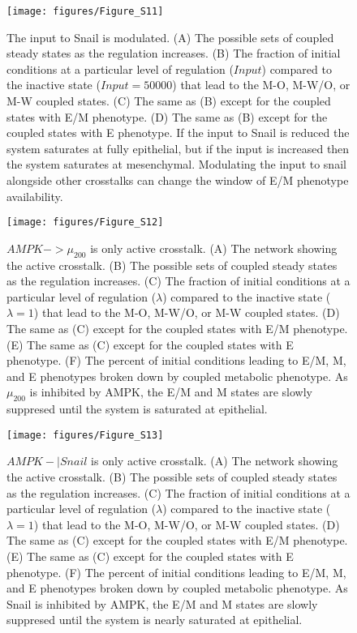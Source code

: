 \documentclass{article}
\begin{document}
\begin{figure}
\texttt{[image: figures/Figure\_S11]}
\caption{The input to Snail is modulated. (A) The possible sets of coupled steady states as the regulation increases. (B) The fraction of initial conditions at a particular level of regulation ($Input$) compared to the inactive state ($Input=50000$) that lead to the M-O, M-W/O, or M-W coupled states. (C) The same as  (B) except for the coupled states with E/M phenotype. (D) The same as (B) except for the coupled states with E phenotype. If the input to Snail is reduced the system saturates at fully epithelial, but if the input is increased then the system saturates at mesenchymal. Modulating the input to snail alongside other crosstalks can change the window of E/M phenotype availability.}
\end{figure}

\begin{figure}
\texttt{[image: figures/Figure\_S12]}
\caption{$AMPK -> \mu_{200}$ is only active crosstalk. (A) The network showing the active crosstalk. (B) The possible sets of coupled steady states as the regulation increases. (C) The fraction of initial conditions at a particular level of regulation ($\lambda$) compared to the inactive state ($\lambda=1$) that lead to the M-O, M-W/O, or M-W coupled states. (D) The same as (C) except for the coupled states with E/M phenotype. (E) The same as (C) except for the coupled states with E phenotype. (F) The percent of initial conditions leading to E/M, M, and E phenotypes broken down by coupled metabolic phenotype. As $\mu_{200}$  is inhibited by AMPK, the E/M and M states are slowly suppresed until the system is saturated at epithelial. }
\end{figure}




\begin{figure}
\texttt{[image: figures/Figure\_S13]}
\caption{$AMPK -| Snail$ is only active crosstalk. (A) The network showing the active crosstalk. (B) The possible sets of coupled steady states as the regulation increases. (C) The fraction of initial conditions at a particular level of regulation ($\lambda$) compared to the inactive state ($\lambda=1$) that lead to the M-O, M-W/O, or M-W coupled states. (D) The same as (C) except for the coupled states with E/M phenotype. (E) The same as (C) except for the coupled states with E phenotype. (F) The percent of initial conditions leading to E/M, M, and E phenotypes broken down by coupled metabolic phenotype. As Snail is inhibited by AMPK, the E/M and M states are slowly suppresed until the system is nearly saturated at epithelial. }

\end{figure}
\end{document}
